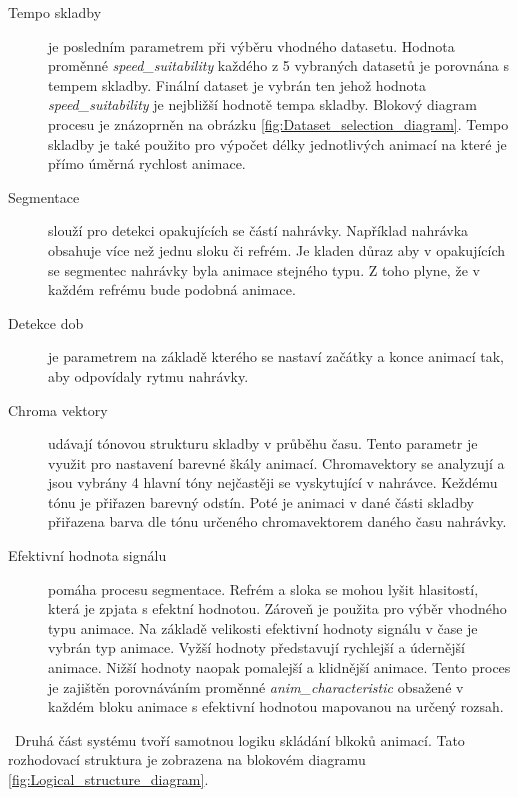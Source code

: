 \begin{description}
    \item[Tempo skladby] je posledním parametrem při výběru vhodného datasetu. 
    Hodnota proměnné \textit{speed\_suitability} každého z 5 vybraných datasetů je porovnána s tempem skladby. Finální dataset je vybrán ten jehož hodnota \textit{speed\_suitability} je nejbližší hodnotě tempa skladby. Blokový diagram procesu je znázoprněn na obrázku \ref{fig:Dataset_selection_diagram}. Tempo skladby je také použito pro výpočet délky jednotlivých animací na které je přímo úměrná rychlost animace.
    \item[Segmentace] slouží pro detekci opakujících se částí nahrávky. Například nahrávka obsahuje více než jednu sloku či refrém. Je kladen důraz aby v opakujících se segmentec nahrávky byla animace stejného typu. Z toho plyne, že v každém refrému bude podobná animace.
    \item[Detekce dob] je parametrem na základě kterého se nastaví začátky a konce animací tak, aby odpovídaly rytmu nahrávky.
    \item[Chroma vektory] udávají tónovou strukturu skladby v průběhu času. Tento parametr je využit pro nastavení barevné škály animací. Chromavektory se analyzují a jsou vybrány 4 hlavní tóny nejčastěji se vyskytující v nahrávce. Keždému tónu je přiřazen barevný odstín. Poté je animaci v dané části skladby přiřazena barva dle tónu určeného chromavektorem daného času nahrávky.
    \item[Efektivní hodnota signálu] pomáha procesu segmentace. Refrém a sloka se mohou lyšit hlasitostí, která je zpjata s efektní hodnotou. Zároveň je použita pro výběr vhodného typu animace. Na základě velikosti efektivní hodnoty signálu v čase je vybrán typ animace. Vyžší hodnoty představují rychlejší a údernější animace. Nižší hodnoty naopak pomalejší a klidnější animace. Tento proces je zajištěn porovnáváním proměnné \textit{anim\_characteristic} obsažené v každém bloku animace s efektivní hodnotou mapovanou na určený rozsah.
\end{description}

\
Druhá část systému tvoří samotnou logiku skládání blkoků animací. Tato rozhodovací struktura je zobrazena na blokovém diagramu \ref{fig:Logical_structure_diagram}.

